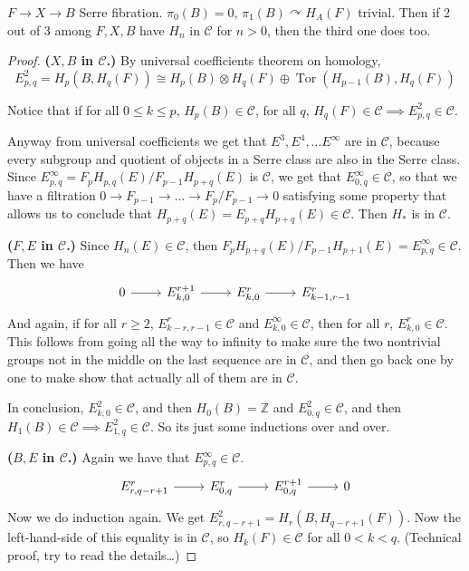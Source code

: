 \documentclass{article}
\newcommand{\Z}{\mathbb{Z}}
\newcommand{\Cc}{\mathcal{C}}
\DeclareMathOperator{\Tor}{Tor}
\begin{document}
\begin{prop}
	$F\to X\to B$ Serre fibration. $\pi_0(B)=0$, $\pi_1(B)\curvearrowright H_A(F)$ trivial. Then if 2 out of 3 among $F,X,B$ have $H_n$ in $\Cc$ for $n>0$, then the third one does too.
\end{prop}
\begin{proof}\leavevmode
	
	\textbf{($X,B$ in $\Cc$.)} By universal coefficients theorem on homology,
	\[E_{p,q}^2=H_p(B,H_q(F))\cong H_p(B)\otimes H_q(F)\oplus\Tor(H_{p-1}(B),H_q(F))\]
	\begin{lemma}
		Notice that if for all $0\leq k\leq p$, $H_p(B)\in\Cc$, for all $q$, $H_q(F)\in\Cc\implies E^2_{p,q}\in\Cc$.
	\end{lemma}
	Anyway from universal coefficients we get that $E^3,E^4,\ldots E^\infty$ are in $\Cc$, because every subgroup and quotient of objects in a Serre class are also in the Serre class. Since $E^\infty_{p,q}=F_pH_{p,q}(E)/F_{p-1}H_{p+q}(E)$ is $\Cc$, we get that $E_{0,q}^\infty\in\Cc$, so that we have a filtration $0\to F_{p-1}\to\ldots\to F_p/F_{p-1}\to 0$ {\color{azure}satisfying some property that allows us to conclude that} $H_{p+q}(E)=E_{p+q}H_{p+q}(E)\in\Cc$. Then $H_*$ is in $\Cc$.
	
	\vspace{2em}
	\textbf{($F,E$ in $\Cc$.)} Since $H_n(E)\in\Cc$, then $F_pH_{p+q}(E)/F_{p-1}H_{p+1}(E)=E^\infty_{p,q}\in\Cc$. Then we have
	\[\begin{tikzcd}
		0\arrow[r]&E^{r+1}_{k,0}\arrow[r]&E^r_{k,0}\arrow[r]&E^r_{k-1,r-1}
	\end{tikzcd}\]
	And again, if for all $r\geq2$, $E^r_{k-r,r-1}\in\Cc$ and $E^\infty_{k,0}\in\Cc$, then for all $r$, $E^r_{k,0}\in\Cc$. {\color{azure}This follows from going all the way to infinity to make sure the two nontrivial groups not in the middle on the last sequence are in $\Cc$, and then go back one by one to make show that actually all of them are in $\Cc$.}
	
	In conclusion, $E^2_{k,0}\in\Cc$, and then $H_0(B)=\Z$ and $E^2_{0,q}\in\Cc$, and then $H_1(B)\in\Cc\implies E^2_{1,q}\in\Cc$. {\color{azure}So its just some inductions over and over.}
	
	\vspace{2em}
	\textbf{($B,E$ in $\Cc$.)} Again we have that $E^\infty_{p,q}\in\Cc$.
	\[\begin{tikzcd}
		E^{r}_{r,q-r+1}\arrow[r]&E^r_{0,q}\arrow[r]&E^{r+1}_{0,q}\arrow[r]&0
	\end{tikzcd}\]
	{\color{azure}Now we do induction again}. We get $E^2_{r,q-r+1}=H_r(B,H_{q-r+1}(F))$. Now the left-hand-side of this equality is in $\Cc$, so $H_k(F)\in\Cc$ for all $0<k<q$. {\color{azure}(Technical proof, try to read the details…)}
\end{proof}
\end{document}
